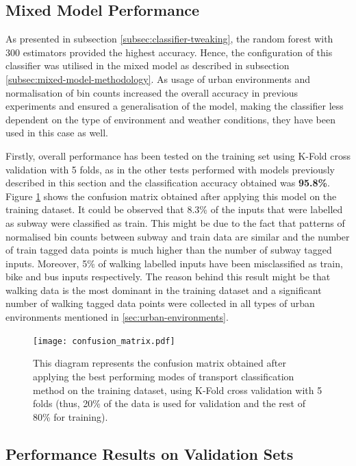 \documentclass[bsc,frontabs,twoside,singlespacing, parskip,deptreport]{infthesis}     %
\begin{document}
\subsection{Mixed Model Performance}

As presented in subsection \ref{subsec:classifier-tweaking}, the random forest with 300 estimators provided the highest accuracy. Hence, the configuration of this classifier was utilised in the mixed model as described in subsection \ref{subsec:mixed-model-methodology}. As usage of urban environments and normalisation of bin counts increased the overall accuracy in previous experiments and ensured a generalisation of the model, making the classifier less dependent on the type of environment and weather conditions, they have been used in this case as well. 

Firstly, overall performance has been tested on the training set using K-Fold cross validation with 5 folds, as in the other tests performed with models previously described in this section and the classification accuracy obtained was \textbf{95.8\%}. Figure \ref{fig:confusion_matrix} shows the confusion matrix obtained after applying this model on the training dataset. It could be observed that 8.3\% of the inputs that were labelled as subway were classified as train. This might be due to the fact that patterns of normalised bin counts between subway and train data are similar and the number of train tagged data points is much higher than the number of subway tagged inputs. Moreover, 5\% of walking labelled inputs have been misclassified as train, bike and bus inputs respectively. The reason behind this result might be that walking data is the most dominant in the training dataset and a significant number of walking tagged data points were collected in all types of urban environments mentioned in \ref{sec:urban-environments}.

\begin{figure}[h!]
  \center
  \texttt{[image: confusion\_matrix.pdf]}
  \caption{This diagram represents the confusion matrix obtained after applying the best performing modes of transport classification method on the training dataset, using K-Fold cross validation with 5 folds (thus, 20\% of the data is used for validation and the rest of 80\% for training).}
  \label{fig:confusion_matrix}
\end{figure}


\subsection{Performance Results on Validation Sets}
\label{subsec:validation-performance}
\end{document}
